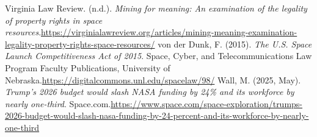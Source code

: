 \begin{referencelist}
   Virginia Law Review. (n.d.). \emph{Mining for meaning: An examination of the legality of property rights in space resources}.\url{https://virginialawreview.org/articles/mining-meaning-examination-legality-property-rights-space-resources/}
   von der Dunk, F. (2015). \emph{The U.S. Space Launch Competitiveness Act of 2015}. Space, Cyber, and Telecommunications Law Program Faculty Publications, University of Nebraska.\url{https://digitalcommons.unl.edu/spacelaw/98/}
   Wall, M. (2025, May). \emph{Trump's 2026 budget would slash NASA funding by 24\% and its workforce by nearly one-third}. Space.com.\url{https://www.space.com/space-exploration/trumps-2026-budget-would-slash-nasa-funding-by-24-percent-and-its-workforce-by-nearly-one-third}
\end{referencelist}

